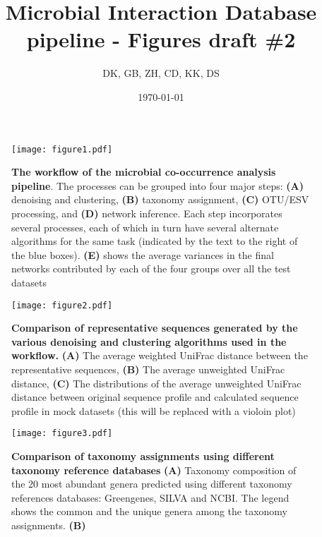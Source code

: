




\title{ \huge Microbial Interaction Database pipeline - Figures draft \#2 }
\author{DK, GB, ZH, CD, KK, DS}
\date{\today}



\maketitle

\begin{figure}[h]
  \centering
  \texttt{[image: figure1.pdf]}
  \caption{
    \textbf{The workflow of the microbial co-occurrence analysis pipeline}.
    The processes can be grouped into four major steps: \textbf{(A)} denoising and clustering, \textbf{(B)} taxonomy assignment, \textbf{(C)} OTU/ESV processing, and \textbf{(D)} network inference.
    Each step incorporates several processes, each of which in turn have several alternate algorithms for the same task (indicated by the text to the right of the blue boxes).
    \textbf{(E)} shows the average variances in the final networks contributed by each of the four groups over all the test datasets
  }
  \label{fig:main_figure}
\end{figure}

\begin{figure}[h]
  \centering
  \texttt{[image: figure2.pdf]}
  \caption{
    \textbf{Comparison of representative sequences generated by the various denoising and clustering algorithms used in the workflow.}
    \textbf{(A)} The average weighted UniFrac distance between the representative sequences,
    \textbf{(B)} The average unweighted UniFrac distance,
    \textbf{(C)} The distributions of the average unweighted UniFrac distance between original sequence profile and calculated sequence profile in mock datasets (this will be replaced with a violoin plot)
  }
  \label{fig:figure2}
\end{figure}

\begin{figure}[h]
  \centering
  \texttt{[image: figure3.pdf]}
  \caption{
    \textbf{Comparison of taxonomy assignments using different taxonomy reference databases}
    \textbf{(A)} Taxonomy composition of the 20 most abundant genera predicted using different taxonomy references databases: Greengenes, SILVA and NCBI.
    The legend shows the common and the unique genera among the taxonomy assignments.
    \textbf{(B)}
  }
  \label{fig:figure3}
\end{figure}

